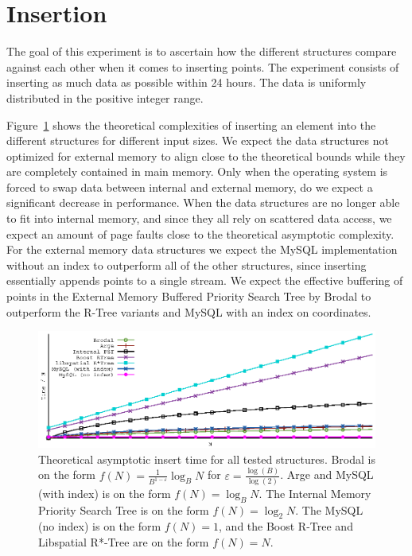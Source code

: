 \documentclass[twoside,11pt,openright]{report}
\def \epsilon {\varepsilon}
\begin{document}
\clearpage

\section{Insertion}
\label{sec:insertion}
The goal of this experiment is to ascertain how the different structures compare against each other when it comes to inserting points. The experiment consists of inserting as much data as possible within 24 hours. The data is uniformly distributed in the positive integer range.

Figure~\ref{fig:theory_insert_complexity} shows the theoretical complexities of inserting an element into the different structures for different input sizes. We expect the data structures not optimized for external memory to align close to the theoretical bounds while they are completely contained in main memory. Only when the operating system is forced to swap data between internal and external memory, do we expect a significant decrease in performance. When the data structures are no longer able to fit into internal memory, and since they all rely on scattered data access, we expect an amount of page faults close to the theoretical asymptotic complexity. For the external memory data structures we expect the MySQL implementation without an index to outperform all of the other structures, since inserting essentially appends points to a single stream. We expect the effective buffering of points in the External Memory Buffered Priority Search Tree by Brodal to outperform the R-Tree variants and MySQL with an index on coordinates.

\begin{figure}[h]
\centering
\includegraphics[width=\textwidth]{../plots/insert_complexities/insert_complexity}
\caption{Theoretical asymptotic insert time for all tested structures. Brodal is on the form $f(N) = \frac{1}{B^{1-\epsilon}} \log_B N$ for $\epsilon = \frac{\log(B)}{\log(2)}$. Arge and MySQL (with index) is on the form $f(N) = \log_B N$. The Internal Memory Priority Search Tree is on the form $f(N) = \log_2 N$. The MySQL (no index) is on the form $f(N) = 1$, and the Boost R-Tree and Libspatial R*-Tree are on the form $f(N) = N$.}
\label{fig:theory_insert_complexity}
\end{figure}
\end{document}
